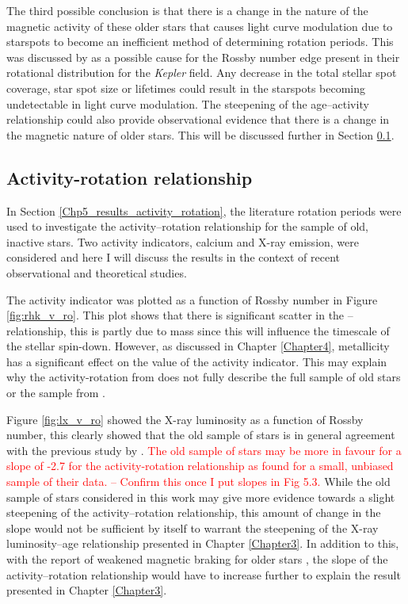 The third possible conclusion is that there is a change in the nature of the magnetic activity of these older stars that causes light curve modulation due to starspots to become an inefficient method of determining rotation periods. This was discussed by \citet{van_Saders_etal_2019} as a possible cause for the Rossby number edge present in their rotational distribution for the \textit{Kepler} field. Any decrease in the total stellar spot coverage, star spot size or lifetimes could result in the starspots becoming undetectable in light curve modulation. The steepening of the age--activity relationship \citet{Booth_etal_2017} could also provide observational evidence that there is a change in the magnetic nature of older stars. This will be discussed further in Section \ref{Chp5_discuss_activity_rotation}.

\subsection{Activity-rotation relationship}
\label{Chp5_discuss_activity_rotation}
In Section \ref{Chp5_results_activity_rotation}, the literature rotation periods were used to investigate the activity--rotation relationship for the sample of old, inactive stars. Two activity indicators, calcium and X-ray emission, were considered and here I will discuss the results in the context of recent observational and theoretical studies.

The \Rprime activity indicator was plotted as a function of Rossby number in Figure \ref{fig:rhk_v_ro}. This plot shows that there is significant scatter in the \Rprime--\Ro relationship, this is partly due to mass since this will influence the timescale of the stellar spin-down. However, as discussed in Chapter \ref{Chapter4}, metallicity has a significant effect on the value of the \Rprime activity indicator. This may explain why the activity-rotation from \citet{Mamajek_Hillenbrand_2008} does not fully describe the full sample of old stars or the sample from \citet{Baliunas_etal_1996}.

Figure \ref{fig:lx_v_ro} showed the X-ray luminosity as a function of Rossby number, this clearly showed that the old sample of stars is in general agreement with the previous study by \citet{Wright_etal_2011}. \textcolor{red}{The old sample of stars may be more in favour for a slope of -2.7 for the activity-rotation relationship as \citet{Wright_etal_2011} found for a small, unbiased sample of their data. -- Confirm this once I put slopes in Fig 5.3.} While the old sample of stars considered in this work may give more evidence towards a slight steepening of the activity--rotation relationship, this amount of change in the slope would not be sufficient by itself to warrant the steepening of the X-ray luminosity--age relationship presented in Chapter \ref{Chapter3}. In addition to this, with the report of weakened magnetic braking for older stars \citep{van_Saders_etal_2016}, the slope of the activity--rotation relationship would have to increase further to explain the result presented in Chapter \ref{Chapter3}. 

